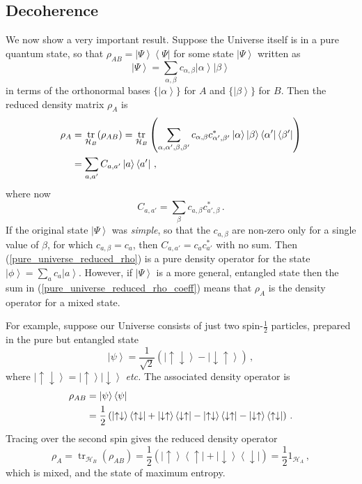 \documentclass{article}
\theoremstyle{plain}\theoremheaderfont{\normalfont\itshape}\theorembodyfont{\rmfamily}\theoremseparator{.}\newtheorem*{rem}{Remark}\newtheorem*{ex}{Example}\newtheorem*{proof}{Proof}\newtheorem*{altp}{Alternative proof}
\theoremstyle{plain}\theoremheaderfont{\normalfont\bfseries}\theorembodyfont{\rmfamily}\theoremseparator{.}\newtheorem{thm}{Theorem}[section]\newtheorem{lem}[thm]{Lemma}\newtheorem{prop}[thm]{Proposition}\newtheorem*{cor}{Corollary}\newtheorem{defn}[thm]{Definition}\newtheorem{clm}[thm]{Claim}\newtheorem{clminproof}{Claim}
\theoremstyle{break}\theoremheaderfont{\normalfont\itshape}\theorembodyfont{\rmfamily}\theoremseparator{.\medskip}\newtheorem*{proofskip}{Proof}\newtheorem*{exs}{Examples}\newtheorem*{rems}{Remarks}
\theoremstyle{break}\theoremheaderfont{\normalfont\bfseries}\theorembodyfont{\rmfamily}\theoremseparator{.\medskip}\newtheorem{lemskip}[thm]{Lemma}\newtheorem{defnskip}[thm]{Definition}\newtheorem{propskip}[thm]{Proposition}\newtheorem{thmskip}[thm]{Theorem}
\numberwithin{equation}{section}
\newcommand{\bra}[1]{\left\langle #1 \right|}
\newcommand{\ket}[1]{\left| #1 \right\rangle}
\newcommand{\hb}{\mathcal{H}}
\DeclareMathOperator{\tr}{tr}
\begin{document}
    \subsection{Decoherence}
    We now show a very important result. Suppose the Universe itself is in a pure quantum state, so that \(\rho_{AB}=\ket{\Psi}\bra{\Psi}\) for some state \(\ket{\Psi}\) written as
    \begin{equation}
        \ket{\Psi}=\sum_{\alpha,\beta}c_{\alpha,\beta}\ket{\alpha}\ket{\beta}
    \end{equation}
    in terms of the orthonormal bases \(\{\ket{\alpha}\}\) for \(A\) and \(\{\ket{\beta}\}\) for \(B\). Then the reduced density matrix \(\rho_A\) is
    \begin{align}
        \rho_A&=\tr_{\hb_B}(\rho_{AB})=\tr_{\hb_B}\left(\sum_{\alpha,\alpha',\beta,\beta'}c_{\alpha,\beta}c_{\alpha',\beta'}^*\ket{\alpha}\ket{\beta}\bra{\alpha'}\bra{\beta'}\right)\notag\\
        &=\sum_{a,a'}C_{a,a'}\ket{a}\bra{a'}\,,\label{pure_universe_reduced_rho}
    \end{align}
    where now
    \begin{equation}\label{pure_universe_reduced_rho_coeff}
        C_{a,a'}=\sum_\beta c_{a,\beta}c_{a',\beta}^*\,.
    \end{equation}
    If the original state \(\ket{\Psi}\) was \textit{simple}, so that the \(c_{a,\beta}\) are non-zero only for a single value of \(\beta\), for which \(c_{a,\beta}=c_a\), then \(C_{a,a'}=c_a c_{a'}^*\) with no sum. Then (\ref{pure_universe_reduced_rho}) is a pure density operator for the state \(\ket{\phi}=\sum_a c_a\ket{a}\). However, if \(\ket{\Psi}\) is a more general, entangled state then the sum in (\ref{pure_universe_reduced_rho_coeff}) means that \(\rho_A\) is the density operator for a mixed state.

    For example, suppose our Universe consists of just two spin-\(\frac{1}{2}\) particles, prepared in the pure but entangled state
    \begin{equation}
        \ket{\psi}=\frac{1}{\sqrt{2}}\left(\ket{\uparrow\downarrow}-\ket{\downarrow\uparrow}\right)\,,
    \end{equation}
    where \(\ket{\uparrow\downarrow}=\ket{\uparrow}\ket{\downarrow}\) \textit{etc.} The associated density operator is
    \begin{align}
        \rho_{AB}&=\ket{\psi}\bra{\psi}\notag\\
        &=\frac{1}{2}\left(\ket{\uparrow\downarrow}\bra{\uparrow\downarrow}+\ket{\downarrow\uparrow}\bra{\downarrow\uparrow}-\ket{\uparrow\downarrow}\bra{\downarrow\uparrow}-\ket{\downarrow\uparrow}\bra{\uparrow\downarrow}\right)\,.
    \end{align}
    Tracing over the second spin gives the reduced density operator
    \begin{equation}
        \rho_A=\tr_{\hb_B}(\rho_{AB})=\frac{1}{2}\left(\ket{\uparrow}\bra{\uparrow}+\ket{\downarrow}\bra{\downarrow}\right)=\frac{1}{2}1_{\hb_A}\,,
    \end{equation}
    which is mixed, and the state of maximum entropy.
\end{document}
